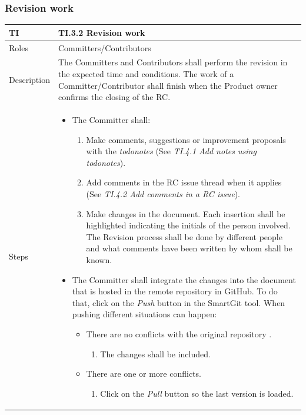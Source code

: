 \documentclass{template/openetcs_article}
\begin{document}
\subsubsection{Revision work}

\begin{flushleft}
\tablefirsthead{}
\tablehead{}
\tabletail{}
\tablelasttail{}
\begin{supertabular}{|m{2cm}|m{13cm}|}
\hline
{}
TI & 
TI.3.2 Revision work
\\\hline
Roles &
Committers/Contributors
\\\hline
Description &
The Committers and Contributors shall perform the revision in the expected time and conditions. The work of a Committer/Contributor shall finish when the Product owner confirms the closing of the RC.
\\\hline
Steps &
\begin{itemize}
\item The Committer shall:
\begin{enumerate}
\item Make comments, suggestions or improvement proposals with the {\it todonotes} (See {\it TI.4.1 Add notes using todonotes}).
\item Add comments in the RC issue thread when it applies (See {\it TI.4.2 Add comments in a RC issue}).
\item Make changes in the document. Each insertion shall be highlighted indicating the initials of the person involved. The Revision process shall be done by different people and what comments have been written by whom shall be known.
\end{enumerate}
\item The Committer shall integrate the changes into the document that is hosted in the remote repository in GitHub. To do that, click on the {\it Push} button in the SmartGit tool. When pushing different situations can happen:
\begin{itemize}
\item There are no conflicts with the original repository .
\begin{enumerate}
\item The changes shall be included.
\end{enumerate}
\end{itemize}
\begin{itemize}
\item There are one or more conflicts.
\begin{enumerate}
\item Click on the {\it Pull} button so the last version is loaded. 

\end{enumerate}
\end{itemize}
\end{itemize}
\end{supertabular}
\end{flushleft}
\end{document}
